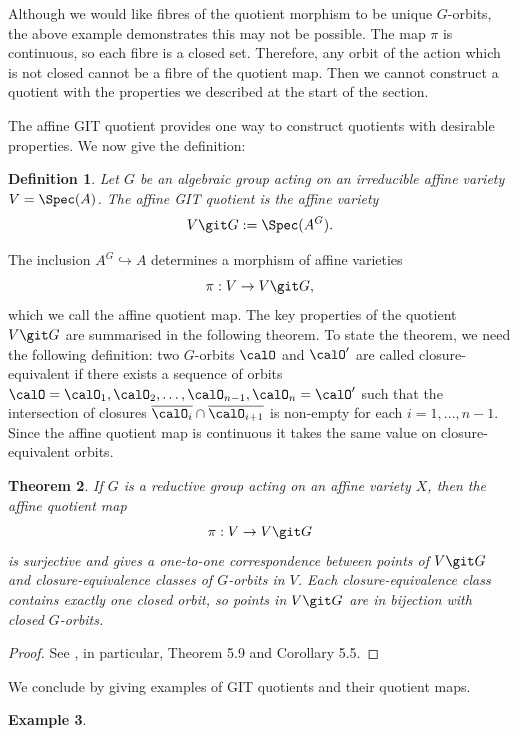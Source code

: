 \documentclass[12pt]{amsart}
\theoremstyle{plain}
\newtheorem{theorem}{Theorem}[subsection]
\newtheorem{definition}[theorem]{Definition}
\newtheorem{example}[theorem]{Example}
\begin{document}
Although we would like fibres of the quotient morphism to be unique $G$-orbits, the above example demonstrates this may not be possible.
The map $\pi$ is continuous, so each fibre is a closed set.
Therefore, any orbit of the action which is not closed cannot be a fibre of the quotient map.
Then we cannot construct a quotient with the properties we described at the start of the section.

The affine GIT quotient provides one way to construct quotients with desirable properties.
We now give the definition:

\begin{definition}
Let $G$ be an algebraic group acting on an irreducible affine variety $V = \Spec(A)$.
The affine GIT quotient is the affine variety
$$V \git G := \Spec(A^G).$$
\end{definition}

The inclusion $A^G \hookrightarrow A$ determines a morphism of affine varieties
$$\pi : V \to V \git G,$$
which we call the affine quotient map.
The key properties of the quotient $V \git G$ are summarised in the following theorem.
To state the theorem, we need the following definition:
two $G$-orbits $\calO$ and $\calO'$ are called closure-equivalent if there exists a sequence of orbits $\calO = \calO_1, \calO_2, \ldots, \calO_{n-1}, \calO_n = \calO'$ such that the intersection of closures $\overline{\calO_i} \cap \overline{\calO_{i+1}}$ is non-empty for each $i=1, \ldots, n-1$.
Since the affine quotient map is continuous it takes the same value on closure-equivalent orbits.

\begin{theorem}
If $G$ is a reductive group acting on an affine variety $X$, then the affine quotient map
$$\pi : V \to V \git G$$
is surjective and gives a one-to-one correspondence between points of $V \git G$ and closure-equivalence classes of $G$-orbits in $V$.
Each closure-equivalence class contains exactly one closed orbit, so points in $V \git G$ are in bijection with closed $G$-orbits.
\end{theorem}
\begin{proof}
See \cite[\S 5.1]{Mukai03}, in particular, Theorem 5.9 and Corollary 5.5.
\end{proof}

We conclude by giving examples of GIT quotients and their quotient maps.

\begin{example}

\end{example}
\end{document}
